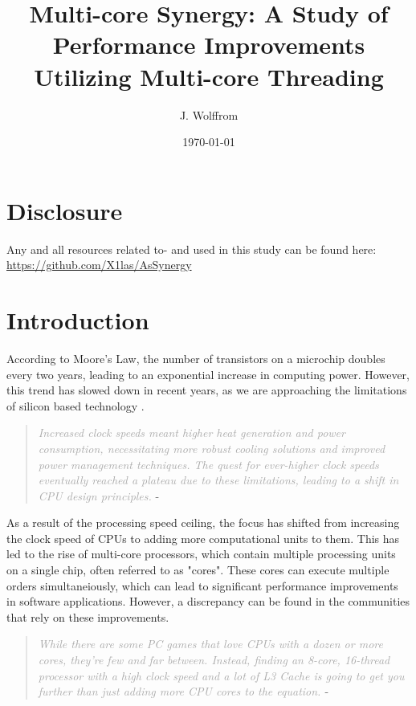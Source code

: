\documentclass{article}
\title{Multi-core Synergy: A Study of Performance Improvements Utilizing Multi-core Threading}
\author{J. Wolffrom}
\date{\today}
\begin{document}
\maketitle
\newpage

\begin{abstract}

\end{abstract}
\newpage

\tableofcontents
\newpage

\section{Disclosure}

Any and all resources related to- and used in this study can be found here: \href{https://github.com/X1las/AsSynergy}{https://github.com/X1las/AsSynergy}


\section{Introduction}

According to Moore's Law, the number of transistors on a microchip doubles every two years, leading to an exponential increase in computing power. However, this trend has slowed down in recent years, as we are approaching the limitations of silicon based technology \parencite{Mattson2014}.

\begin{quote}
    \textit{\textcolor{darkgray}{Increased clock speeds meant higher heat generation and power consumption, necessitating more robust cooling solutions and improved power management techniques. The quest for ever-higher clock speeds eventually reached a plateau due to these limitations, leading to a shift in CPU design principles.}} - \parencite{mscodes} 
\end{quote}

As a result of the processing speed ceiling, the focus has shifted from increasing the clock speed of CPUs to adding more computational units to them. This has led to the rise of multi-core processors, which contain multiple processing units on a single chip, often referred to as "cores". These cores can execute multiple orders simultaneiously, which can lead to significant performance improvements in software applications. However, a discrepancy can be found in the communities that rely on these improvements.

\begin{quote}
    \textit{\textcolor{darkgray}{While there are some PC games that love CPUs with a dozen or more cores, they’re few and far between. 
    Instead, finding an 8-core, 16-thread processor with a high clock speed and a lot of L3 Cache is going to get you further than just adding more CPU cores to the equation. }} 
    - \parencite{Thomas2025}
\end{quote}
\end{document}
